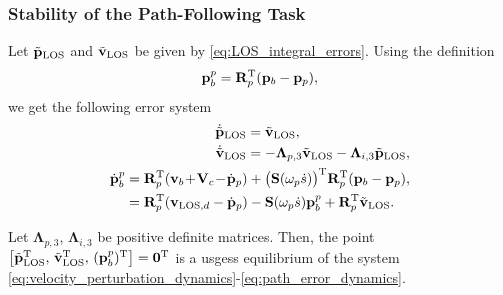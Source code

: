 \subsubsection{Stability of the Path-Following Task}
Let $\Tilde{\mathbf{p}}_{\rm LOS}$ and $\Tilde{\mathbf{v}}_{\rm LOS}$ be given by \eqref{eq:LOS_integral_errors}. Using the definition
\begin{equation}
    \mathbf{p}_b^p = \mathbf{R}_p^{\mathrm{T}}(\mathbf{p}_b - \mathbf{p}_p),
\end{equation}
we get the following error system
\begin{subequations}
\begin{align}
    \begin{split}\label{eq:velocity_perturbation_dynamics}
        \dot{\Tilde{\mathbf{p}}}_{\rm LOS} &= \Tilde{\mathbf{v}}_{\rm LOS},\\
        \dot{\Tilde{\mathbf{v}}}_{\rm LOS} &= -\mathbf{\Lambda}_{p,3} \Tilde{\mathbf{v}}_{\rm LOS} - \mathbf{\Lambda}_{i,3}\Tilde{\mathbf{p}}_{\rm LOS},
    \end{split} \\
        \begin{split}
            \dot{\mathbf{p}}_b^p &= \mathbf{R}_p^{\mathrm{T}}(\mathbf{v}_b \!+\! \mathbf{V}_c\!-\!\dot{\mathbf{p}}_p) +  \bigl(\mathbf{S}(\omega_p \dot{s})\bigr)^{\mathrm{T}}\mathbf{R}_p^{\mathrm{T}}(\mathbf{p}_b - \mathbf{p}_p),\\
            &= \mathbf{R}_p^{\mathrm{T}}(\mathbf{v}_{{\rm LOS}, d} -\dot{\mathbf{p}}_p) - \mathbf{S}(\omega_p \dot{s})\mathbf{p}_b^p +\mathbf{R}_p^{\mathrm{T}}\Tilde{\mathbf{v}}_{\rm LOS}.\label{eq:path_error_dynamics}
        \end{split} 
\end{align}
\end{subequations}
\begin{theorem}\label{theorem:path_error}
    Let $\bm{\Lambda}_{p,3}$, $\bm{\Lambda}_{i,3}$ be positive definite matrices. Then, the point $\left[\Tilde{\mathbf{p}}_{\rm LOS}^{\mathrm{T}},\, \Tilde{\mathbf{v}}_{\rm LOS}^{\mathrm{T}}, \,(\mathbf{p}_b^p)^{\mathrm{T}}\right] = \mathbf{0}^{\mathrm{T}}$ is a \glspl{usges} equilibrium of the system \eqref{eq:velocity_perturbation_dynamics}-\eqref{eq:path_error_dynamics}.    
\end{theorem}


